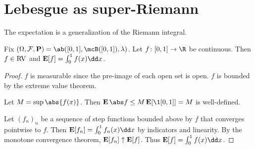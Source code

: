 \section{Lebesgue as super-Riemann} \label{sec:lebesgue-riemann}
The expectation is a generalization of the Riemann integral.
\begin{proposition*}
    Fix $(\Omega, \F, \P) = \ab([0, 1], \mcB([0, 1]), \lambda)$.
    Let $f\colon [0, 1] \to \R$ be continuous.
    Then $f \in \operatorname{RV}$ and $\E[f] = \int_0^1 f(x) \dd x$.
\end{proposition*}
\begin{proof}
    $f$ is measurable since the pre-image of each open set is open.
    $f$ is bounded by the extreme value theorem.

    Let $M = \sup \abs {f(x)}$.
    Then $\E\abs f \le M \E[\1{[0, 1]}] = M$ is well-defined.

    Let $(f_n)_n$ be a sequence of step functions bounded above by $f$
    that converges pointwise to $f$.
    Then $\E[f_n] = \int_0^1 f_n(x) \dd x$ by indicators and linearity.
    By the monotone convergence theorem, $\operatorname{\mathbf E}[f_n] \uparrow \operatorname{\mathbf E}[f]$.
    Thus $\E[f] = \int_0^1 f(x) \dd x$.
\end{proof}
